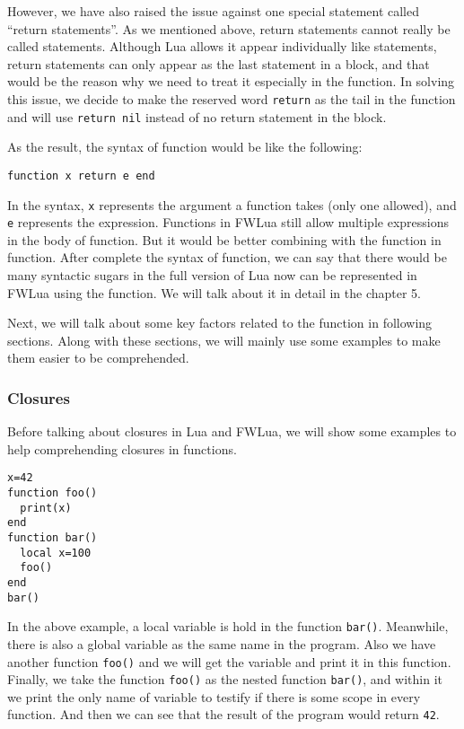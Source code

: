 \documentclass{article}
\begin{document}
However, we have also raised the issue against one special statement called ``return statements''. As we mentioned above, return statements cannot really be called statements. Although Lua allows it appear individually like statements, return statements can only appear as the last statement in a block, and that would be the reason why we need to treat it especially in the function. In solving this issue, we decide to make the reserved word {\tt return} as the tail in the function and will use {\tt return nil} instead of no return statement in the block.

As the result, the syntax of function would be like the following:
\begin{flushleft}
\tt function x {\tt return} e {\tt end}
\end{flushleft}
In the syntax, {\tt x} represents the argument a function takes (only one allowed), and {\tt e} represents the expression. Functions in FWLua still allow multiple expressions in the body of function. But it would be better combining with the function in function. After complete the syntax of function, we can say that there would be many syntactic sugars in the full version of Lua now can be represented in FWLua using the function. We will talk about it in detail in the chapter 5. 

Next, we will talk about some key factors related to the function in following sections. Along with these sections, we will mainly use some examples to make them easier to be comprehended.

\subsubsection{Closures}
Before talking about closures in Lua and FWLua, we will show some examples to help comprehending closures in functions.
\begin{flushleft}
{\tt x=42\\
function foo()\\
~~print(x)\\
end\\
function bar()\\
~~local x=100\\
~~foo()\\
end\\
bar()}
\end{flushleft}
In the above example, a local variable is hold in the function {\tt bar()}. Meanwhile, there is also a global variable as the same name in the program. Also we have another function {\tt foo()} and we will get the variable and print it in this function. Finally, we take the function {\tt foo()} as the nested function {\tt bar()}, and within it we print the only name of variable to testify if there is some scope in every function. And then we can see that the result of the program would return {\tt 42}.
\end{document}
